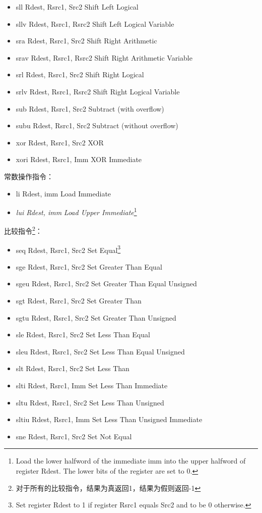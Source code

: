 \documentclass[a4paper, 11pt]{article}
\begin{document}
\begin{itemize}
		\item sll Rdest, Rsrc1, Src2	\hfill Shift Left Logical
		\item sllv Rdest, Rsrc1, Rsrc2	\hfill Shift Left Logical Variable
		\item sra Rdest, Rsrc1, Src2	\hfill Shift Right Arithmetic
		\item srav Rdest, Rsrc1, Rsrc2	\hfill Shift Right Arithmetic Variable
		\item srl Rdest, Rsrc1, Src2	\hfill Shift Right Logical
		\item srlv Rdest, Rsrc1, Rsrc2	\hfill Shift Right Logical Variable
		\item sub Rdest, Rsrc1, Src2	\hfill Subtract (with overflow)
		\item subu Rdest, Rsrc1, Src2	\hfill Subtract (without overflow)
		\item xor Rdest, Rsrc1, Src2	\hfill XOR
		\item xori Rdest, Rsrc1, Imm	\hfill XOR Immediate
	\end{itemize}
	常数操作指令：
	\begin{itemize}
		\item li Rdest, imm	\hfill Load Immediate
		\item \textit{lui Rdest, imm}	\hfill \textit{Load Upper Immediate}\footnote{Load the lower halfword of the immediate imm into the upper halfword of register Rdest. The lower bits of the register are set to 0.}
	\end{itemize}
	比较指令\footnote{对于所有的比较指令，结果为真返回1，结果为假则返回-1}：
	\begin{itemize}
		\item seq Rdest, Rsrc1, Src2	\hfill Set Equal\footnote{Set register Rdest to 1 if register Rsrc1 equals Src2 and to be 0 otherwise.}
		\item sge Rdest, Rsrc1, Src2	\hfill Set Greater Than Equal
		\item sgeu Rdest, Rsrc1, Src2	\hfill Set Greater Than Equal Unsigned
		\item sgt Rdest, Rsrc1, Src2	\hfill Set Greater Than
		\item sgtu Rdest, Rsrc1, Src2	\hfill Set Greater Than Unsigned
		\item sle Rdest, Rsrc1, Src2	\hfill Set Less Than Equal
		\item sleu Rdest, Rsrc1, Src2	\hfill Set Less Than Equal Unsigned
		\item slt Rdest, Rsrc1, Src2	\hfill Set Less Than
		\item slti Rdest, Rsrc1, Imm	\hfill Set Less Than Immediate
		\item sltu Rdest, Rsrc1, Src2	\hfill Set Less Than Unsigned
		\item sltiu Rdest, Rsrc1, Imm	\hfill Set Less Than Unsigned Immediate
		\item sne Rdest, Rsrc1, Src2	\hfill Set Not Equal
	\end{itemize}
\end{document}
